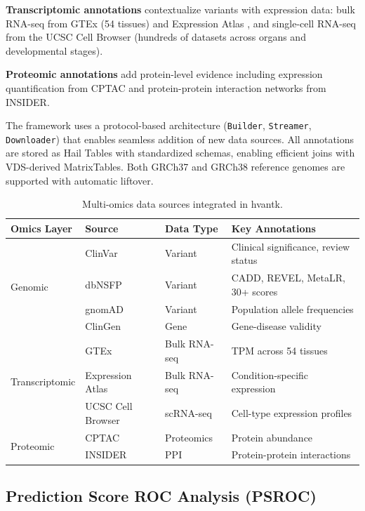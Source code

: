 \documentclass[11pt]{article}
\begin{document}
\textbf{Transcriptomic annotations} contextualize variants with expression data: bulk RNA-seq from GTEx \citep{gtex2020gtex} (54 tissues) and Expression Atlas \citep{papatheodorou2020expression}, and single-cell RNA-seq from the UCSC Cell Browser (hundreds of datasets across organs and developmental stages).

\textbf{Proteomic annotations} add protein-level evidence including expression quantification from CPTAC \citep{mertins2016proteogenomics} and protein-protein interaction networks from INSIDER.

The framework uses a protocol-based architecture (\texttt{Builder}, \texttt{Streamer}, \texttt{Downloader}) that enables seamless addition of new data sources. All annotations are stored as Hail Tables with standardized schemas, enabling efficient joins with VDS-derived MatrixTables. Both GRCh37 and GRCh38 reference genomes are supported with automatic liftover.

\begin{table}[t]
\centering
\caption{Multi-omics data sources integrated in hvantk.}
\label{tab:datasources}
\begin{tabular}{@{}llll@{}}
\toprule
\textbf{Omics Layer} & \textbf{Source} & \textbf{Data Type} & \textbf{Key Annotations} \\
\midrule
\multirow{4}{*}{Genomic} & ClinVar & Variant & Clinical significance, review status \\
 & dbNSFP & Variant & CADD, REVEL, MetaLR, 30+ scores \\
 & gnomAD & Variant & Population allele frequencies \\
 & ClinGen & Gene & Gene-disease validity \\
\midrule
\multirow{3}{*}{Transcriptomic} & GTEx & Bulk RNA-seq & TPM across 54 tissues \\
 & Expression Atlas & Bulk RNA-seq & Condition-specific expression \\
 & UCSC Cell Browser & scRNA-seq & Cell-type expression profiles \\
\midrule
\multirow{2}{*}{Proteomic} & CPTAC & Proteomics & Protein abundance \\
 & INSIDER & PPI & Protein-protein interactions \\
\bottomrule
\end{tabular}
\end{table}

\subsection{Prediction Score ROC Analysis (PSROC)}
\end{document}
